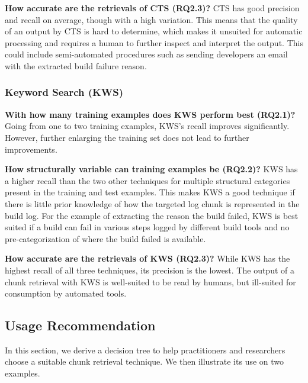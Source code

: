 \documentclass[10pt,journal,compsoc]{IEEEtran}
\begin{document}
\noindent
\textbf{How accurate are the retrievals of CTS (RQ2.3)?}
CTS has good precision and recall on average, though with a high
variation.
This means that the quality of an output by CTS is hard to
determine, which makes it unsuited for automatic processing and requires
a human to further inspect and interpret the output.
This could include semi-automated procedures such as sending
developers an email with the extracted build failure reason.

\subsubsection{Keyword Search (KWS)}
\noindent
\textbf{With how many training examples does KWS perform best (RQ2.1)?}
Going from one to two training examples, KWS's recall improves
significantly.
However, further enlarging the training set
does not lead to further improvements.

\noindent
\textbf{How structurally variable can training examples be (RQ2.2)?}
KWS has a higher recall than the two other techniques for multiple
structural categories present in the training and test examples.
This
makes KWS a good technique if there is little prior knowledge of how
the targeted log chunk is represented in the build log.
For the
example of extracting the reason the build failed, KWS is best suited
if a build can fail in various steps logged by different build
tools and no
pre-categorization of where the build failed is available.

\noindent
\textbf{How accurate are the retrievals of KWS (RQ2.3)?}
While KWS has the highest recall of all three techniques, its
precision is the lowest.
The output of a chunk retrieval with KWS is
well-suited to be read by humans, but ill-suited for consumption by
automated tools.


\subsection{Usage Recommendation}
In this section, we derive a decision tree to help practitioners and
researchers choose a suitable chunk retrieval technique.
We then
illustrate its use on two examples.
\end{document}

